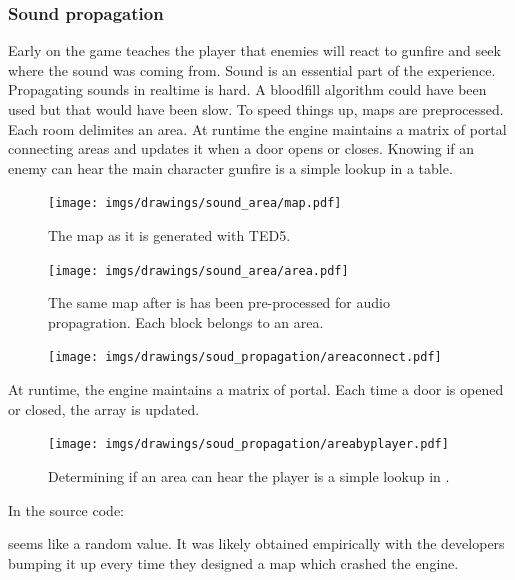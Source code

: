 \subsubsection{Sound propagation}
Early on the game teaches the player that enemies will react to gunfire and seek where the sound was coming from. Sound is an essential part of the experience. Propagating sounds in realtime is hard. A bloodfill algorithm could have been used but that would have been slow. To speed things up, maps are preprocessed. Each room delimites an area. At runtime the engine maintains a matrix of portal connecting areas and updates it when a door opens or closes. Knowing if an enemy can hear the main character gunfire is a simple lookup in a table.

\par
\begin{figure}[H]
 \centering
 \texttt{[image: imgs/drawings/sound\_area/map.pdf]}
 \caption{The map as it is generated with TED5.}
\end{figure}
\par

\par
\begin{figure}[H]
 \centering
 \texttt{[image: imgs/drawings/sound\_area/area.pdf]}
 \caption{The same map after is has been pre-processed for audio propagration. Each block belongs to an area.}
\end{figure}
\par



\begin{figure}[H]
 \centering
 \texttt{[image: imgs/drawings/soud\_propagation/areaconnect.pdf]}
\end{figure}
\par
At runtime, the engine maintains a matrix of portal. Each time a door is opened or closed, the array  is updated. 

\par
\begin{figure}[H]
 \centering
 \texttt{[image: imgs/drawings/soud\_propagation/areabyplayer.pdf]}
 \caption{Determining if an area can hear the player is a simple lookup in .}
\end{figure}
\par
In the source code:\\
\par
\begin{minipage}{\textwidth}

\end{minipage}
\par
{} seems like a random value. It was likely obtained empirically with the developers bumping it up every time they designed a map which crashed the engine.\\
\par








